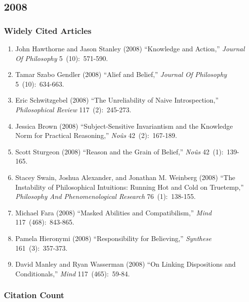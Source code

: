 \documentclass[
  10pt,
  letterpaper,
  DIV=11,
  numbers=noendperiod,
  twoside]{scrartcl}
\providecommand{\tightlist}{%
  \setlength{\itemsep}{0pt}\setlength{\parskip}{0pt}}\usepackage{longtable,booktabs,array}
\begin{document}
\newpage

\subsection{2008}\label{sec-s2008}

\subsubsection*{Widely Cited Articles}\label{widely-cited-articles-52}

\begin{enumerate}
\def\labelenumi{\arabic{enumi}.}
\tightlist
\item
  John Hawthorne and Jason Stanley (2008) ``Knowledge and Action,''
  \emph{Journal Of Philosophy} 5~(10):~571-590.
\item
  Tamar Szabo Gendler (2008) ``Alief and Belief,'' \emph{Journal Of
  Philosophy} 5~(10):~634-663.
\item
  Eric Schwitzgebel (2008) ``The Unreliability of Naive Introspection,''
  \emph{Philosophical Review} 117~(2):~245-273.
\item
  Jessica Brown (2008) ``Subject-Sensitive Invariantism and the
  Knowledge Norm for Practical Reasoning,'' \emph{Noûs} 42~(2):~167-189.
\item
  Scott Sturgeon (2008) ``Reason and the Grain of Belief,'' \emph{Noûs}
  42~(1):~139-165.
\item
  Stacey Swain, Joshua Alexander, and Jonathan M. Weinberg (2008) ``The
  Instability of Philosophical Intuitions: Running Hot and Cold on
  Truetemp,'' \emph{Philosophy And Phenomenological Research}
  76~(1):~138-155.
\item
  Michael Fara (2008) ``Masked Abilities and Compatibilism,''
  \emph{Mind} 117~(468):~843-865.
\item
  Pamela Hieronymi (2008) ``Responsibility for Believing,''
  \emph{Synthese} 161~(3):~357-373.
\item
  David Manley and Ryan Wasserman (2008) ``On Linking Dispositions and
  Conditionals,'' \emph{Mind} 117~(465):~59-84.
\end{enumerate}

\subsubsection*{Citation Count}\label{sec-count-2008}
\end{document}
